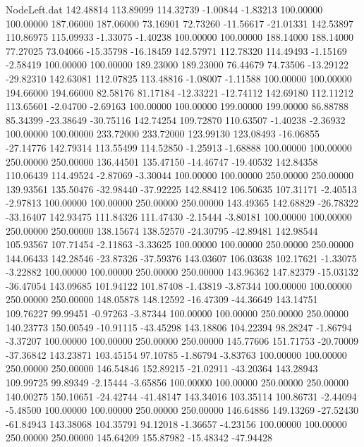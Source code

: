 \begin{filecontents}{NodeLeft.dat}
 142.48814  113.89099  114.32739    -1.00844   -1.83213  100.00000  100.00000  187.06000  187.06000   73.16901   72.73260  -11.56617  -21.01331
 142.53897  110.86975  115.09933    -1.33075   -1.40238  100.00000  100.00000  188.14000  188.14000   77.27025   73.04066  -15.35798  -16.18459
 142.57971  112.78320  114.49493    -1.15169   -2.58419  100.00000  100.00000  189.23000  189.23000   76.44679   74.73506  -13.29122  -29.82310
 142.63081  112.07825  113.48816    -1.08007   -1.11588  100.00000  100.00000  194.66000  194.66000   82.58176   81.17184  -12.33221  -12.74112
 142.69180  112.11212  113.65601    -2.04700   -2.69163  100.00000  100.00000  199.00000  199.00000   86.88788   85.34399  -23.38649  -30.75116
 142.74254  109.72870  110.63507    -1.40238   -2.36932  100.00000  100.00000  233.72000  233.72000  123.99130  123.08493  -16.06855  -27.14776
 142.79314  113.55499  114.52850    -1.25913   -1.68888  100.00000  100.00000  250.00000  250.00000  136.44501  135.47150  -14.46747  -19.40532
 142.84358  110.06439  114.49524    -2.87069   -3.30044  100.00000  100.00000  250.00000  250.00000  139.93561  135.50476  -32.98440  -37.92225
 142.88412  106.50635  107.31171    -2.40513   -2.97813  100.00000  100.00000  250.00000  250.00000  143.49365  142.68829  -26.78322  -33.16407
 142.93475  111.84326  111.47430    -2.15444   -3.80181  100.00000  100.00000  250.00000  250.00000  138.15674  138.52570  -24.30795  -42.89481
 142.98544  105.93567  107.71454    -2.11863   -3.33625  100.00000  100.00000  250.00000  250.00000  144.06433  142.28546  -23.87326  -37.59376
 143.03607  106.03638  102.17621    -1.33075   -3.22882  100.00000  100.00000  250.00000  250.00000  143.96362  147.82379  -15.03132  -36.47054
 143.09685  101.94122  101.87408    -1.43819   -3.87344  100.00000  100.00000  250.00000  250.00000  148.05878  148.12592  -16.47309  -44.36649
 143.14751  109.76227   99.99451    -0.97263   -3.87344  100.00000  100.00000  250.00000  250.00000  140.23773  150.00549  -10.91115  -43.45298
 143.18806  104.22394   98.28247    -1.86794   -3.37207  100.00000  100.00000  250.00000  250.00000  145.77606  151.71753  -20.70009  -37.36842
 143.23871  103.45154   97.10785    -1.86794   -3.83763  100.00000  100.00000  250.00000  250.00000  146.54846  152.89215  -21.02911  -43.20364
 143.28943  109.99725   99.89349    -2.15444   -3.65856  100.00000  100.00000  250.00000  250.00000  140.00275  150.10651  -24.42744  -41.48147
 143.34016  103.35114  100.86731    -2.44094   -5.48500  100.00000  100.00000  250.00000  250.00000  146.64886  149.13269  -27.52430  -61.84943
 143.38068  104.35791   94.12018    -1.36657   -4.23156  100.00000  100.00000  250.00000  250.00000  145.64209  155.87982  -15.48342  -47.94428

\end{filecontents}

